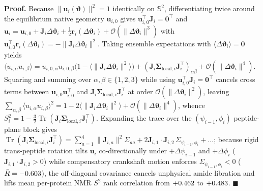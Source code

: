 \documentclass[10pt,letterpaper]{article}
\DeclareMathOperator{\Tr}{Tr}
\begin{document}
\textbf{Proof.} Because $\|\mathbf{u}_i(\bm{\vartheta})\|^2 = 1$ identically on $\mathbb{S}^2$, differentiating twice around the equilibrium native geometry $\mathbf{u}_{i,0}$ gives $\mathbf{u}_{i,0}^\top \mathbf{J}_i = \mathbf{0}^\top$ and $\mathbf{u}_i = \mathbf{u}_{i,0} + \mathbf{J}_i\Delta\bm{\vartheta}_i + \frac{1}{2}\mathbf{r}_i(\Delta\bm{\vartheta}_i) + \mathcal{O}(\|\Delta\bm{\vartheta}_i\|^3)$ with $\mathbf{u}_{i,0}^\top\mathbf{r}_i(\Delta\bm{\vartheta}_i) = -\|\mathbf{J}_i\Delta\bm{\vartheta}_i\|^2$. Taking ensemble expectations with $\langle\Delta\bm{\vartheta}_i\rangle = \mathbf{0}$ yields $\langle u_{i,\alpha} u_{i,\beta}\rangle = u_{i,0,\alpha}u_{i,0,\beta}\big(1 - \langle\|\mathbf{J}_i\Delta\bm{\vartheta}_i\|^2\rangle\big) + (\mathbf{J}_i\bm{\Sigma}_{\mathrm{local},i}\mathbf{J}_i^\top)_{\alpha\beta} + \mathcal{O}(\|\Delta\bm{\vartheta}_i\|^4)$. Squaring and summing over $\alpha,\beta \in \{1,2,3\}$ while using $\mathbf{u}_{i,0}^\top\mathbf{J}_i = \mathbf{0}^\top$ cancels cross terms between $\mathbf{u}_{i,0}\mathbf{u}_{i,0}^\top$ and $\mathbf{J}_i\bm{\Sigma}_{\mathrm{local},i}\mathbf{J}_i^\top$ at order $\mathcal{O}(\|\Delta\bm{\vartheta}_i\|^2)$, leaving $\sum_{\alpha,\beta}\langle u_{i,\alpha}u_{i,\beta}\rangle^2 = 1 - 2\langle\|\mathbf{J}_i\Delta\bm{\vartheta}_i\|^2\rangle + \mathcal{O}(\|\Delta\bm{\vartheta}_i\|^4)$, whence $S^2_i = 1 - \frac{3}{2}\Tr(\mathbf{J}_i\bm{\Sigma}_{\mathrm{local},i}\mathbf{J}_i^\top)$. Expanding the trace over the $(\psi_{i-1},\phi_i)$ peptide-plane block gives $\Tr(\mathbf{J}_i\bm{\Sigma}_{\mathrm{local},i}\mathbf{J}_i^\top) = \sum_{a=1}^4 \|\mathbf{J}_{i,a}\|^2 \Sigma_{aa} + 2\mathbf{J}_{i,1}\cdot\mathbf{J}_{i,2}\,\Sigma_{\psi_{i-1},\phi_i} + \dots$; because rigid trans-peptide rotation tilts $\mathbf{u}_i$ co-directionally under $+\Delta\psi_{i-1}$ and $+\Delta\phi_i$ ($\mathbf{J}_{i,1}\cdot\mathbf{J}_{i,2} > 0$) while compensatory crankshaft motion enforces $\Sigma_{\psi_{i-1},\phi_i} < 0$ ($\bar{R} = -0.603{}$), the off-diagonal covariance cancels unphysical amide libration and lifts mean per-protein NMR $S^2$ rank correlation from $+0.462{}$ to $+0.483{}$. $\blacksquare$
\end{document}

